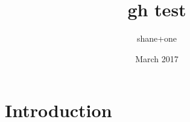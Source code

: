 \documentclass{article}
\title{gh test}
\author{shane+one }
\date{March 2017}
\begin{document}
\maketitle

\section{Introduction}
\end{document}
